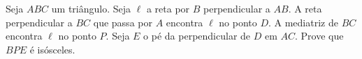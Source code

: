Seja $ABC$ um triângulo. Seja $\ell$ a reta por $B$ perpendicular a $AB$. A reta perpendicular a $BC$ que passa por $A$ encontra $\ell$ no ponto $D$. A mediatriz de $BC$ encontra $\ell$ no ponto $P$. Seja $E$ o pé da perpendicular de $D$ em $AC$. Prove que $BPE$ é isósceles.